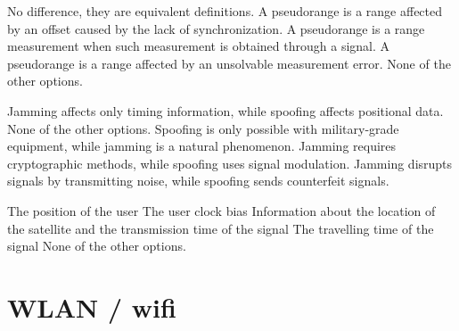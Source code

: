 \begin{questions}
    \begin{checkboxes}
        \choice No difference, they are equivalent definitions.
        \CorrectChoice A pseudorange is a range affected by an offset caused by the lack of synchronization.
        \choice A pseudorange is a range measurement when such measurement is obtained through a signal.
        \choice A pseudorange is a range affected by an unsolvable measurement error.
        \choice None of the other options.
    \end{checkboxes}

    \begin{checkboxes}
        \choice Jamming affects only timing information, while spoofing affects positional data.
        \choice None of the other options.
        \choice Spoofing is only possible with military-grade equipment, while jamming is a natural phenomenon.
        \choice Jamming requires cryptographic methods, while spoofing uses signal modulation.
        \CorrectChoice Jamming disrupts signals by transmitting noise, while spoofing sends counterfeit signals.
    \end{checkboxes}

    \begin{checkboxes}
        \choice The position of the user
        \choice The user clock bias
        \CorrectChoice Information about the location of the satellite and the transmission time of the signal
        \choice The travelling time of the signal
        \choice None of the other options.
    \end{checkboxes}



    \section{WLAN / wifi}




\end{questions}

